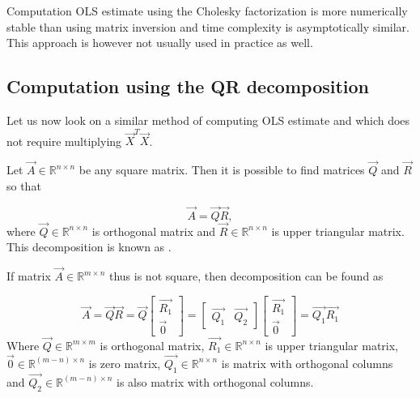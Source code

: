 
Computation OLS estimate using the Cholesky factorization is more numerically stable than using matrix inversion and time complexity is asymptotically similar. This approach is however not usually used in practice as well. 



\subsection{Computation using the QR decomposition}

Let us now look on a similar method of computing OLS estimate and which does not require multiplying $\vec{X}^T\vec{X}$. 

\begin{definition}
    Let $\vec{A} \in \mathbb{R}^{n \times n}$ be any square matrix. Then it is possible to find matrices $\vec{Q}$ and $\vec{R}$ so that 

    \begin{equation}
        \vec{A} = \vec{Q}\vec{R},
    \end{equation}
    where $\vec{Q} \in \mathbb{R}^{n \times n}$ is orthogonal matrix and $\vec{R} \in \mathbb{R}^{n \times n}$ is upper triangular matrix. 
This decomposition is known as .
\end{definition}
If matrix $\vec{A} \in \mathbb{R}^{m \times n}$ thus is not square, then decomposition can be found as

    \begin{equation}
        \vec{A} = \vec{Q}\vec{R} = \vec{Q} \begin{bmatrix}
            \vec{R_1} \\
            \vec{0}
        \end{bmatrix}
        =  \begin{bmatrix}
            \vec{Q_1} & \vec{Q_2}
        \end{bmatrix}  \begin{bmatrix}
            \vec{R_1} \\
            \vec{0}
        \end{bmatrix} 
        = \vec{Q_1} \vec{R_1}
    \end{equation}
    Where $\vec{Q} \in \mathbb{R}^{m \times m}$ is orthogonal matrix, $\vec{R_1} \in \mathbb{R}^{n \times n} $ is upper triangular matrix, $\vec{0} \in \mathbb{R}^{ (m-n) \times n} $  is zero matrix,  $\vec{Q_1} \in \mathbb{R}^{n \times n}$ is matrix with orthogonal columns and  $\vec{Q_2} \in \mathbb{R}^{(m-n) \times n}$ is also matrix with orthogonal columns.
    
